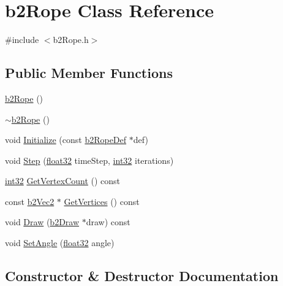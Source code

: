 \hypertarget{classb2_rope}{}\section{b2\+Rope Class Reference}
\label{classb2_rope}


{\ttfamily \#include $<$b2\+Rope.\+h$>$}

\subsection*{Public Member Functions}
\begin{DoxyCompactItemize}
\item 
\mbox{\hyperlink{classb2_rope_af293e6b3cb801f4ecd66553e3cc0a09e}{b2\+Rope}} ()
\item 
\mbox{\hyperlink{classb2_rope_ae18c8d8cf4c4647ca69cfc2cba1e4146}{$\sim$b2\+Rope}} ()
\item 
void \mbox{\hyperlink{classb2_rope_a2a672ca3310790f4af1beb123e597d70}{Initialize}} (const \mbox{\hyperlink{structb2_rope_def}{b2\+Rope\+Def}} $\ast$def)
\item 
void \mbox{\hyperlink{classb2_rope_abe9ce398cef717b136645cbc37f38d70}{Step}} (\mbox{\hyperlink{b2_settings_8h_aacdc525d6f7bddb3ae95d5c311bd06a1}{float32}} time\+Step, \mbox{\hyperlink{b2_settings_8h_a43d43196463bde49cb067f5c20ab8481}{int32}} iterations)
\item 
\mbox{\hyperlink{b2_settings_8h_a43d43196463bde49cb067f5c20ab8481}{int32}} \mbox{\hyperlink{classb2_rope_afdf6f7234dbf73fa83a058452e3d492a}{Get\+Vertex\+Count}} () const
\item 
const \mbox{\hyperlink{structb2_vec2}{b2\+Vec2}} $\ast$ \mbox{\hyperlink{classb2_rope_acf2b433c741b90b3668ff4477b4a8319}{Get\+Vertices}} () const
\item 
void \mbox{\hyperlink{classb2_rope_a9545f16b4ed203890a290d58ba56255c}{Draw}} (\mbox{\hyperlink{classb2_draw}{b2\+Draw}} $\ast$draw) const
\item 
void \mbox{\hyperlink{classb2_rope_a8a1717a5e0b2c54d56fe438c8cae43b7}{Set\+Angle}} (\mbox{\hyperlink{b2_settings_8h_aacdc525d6f7bddb3ae95d5c311bd06a1}{float32}} angle)
\end{DoxyCompactItemize}


\subsection{Constructor \& Destructor Documentation}
\mbox{\label{classb2_rope_af293e6b3cb801f4ecd66553e3cc0a09e}} 
